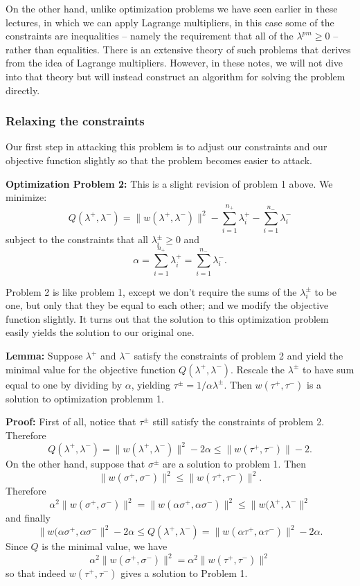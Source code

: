 \documentclass[
]{article}
\begin{document}
On the other hand, unlike optimization problems we have seen earlier in
these lectures, in which we can apply Lagrange multipliers, in this case
some of the constraints are inequalities -- namely the requirement that
all of the \(\lambda^{pm}\ge 0\) -- rather than equalities. There is an
extensive theory of such problems that derives from the idea of Lagrange
multipliers. However, in these notes, we will not dive into that theory
but will instead construct an algorithm for solving the problem
directly.

\hypertarget{relaxing-the-constraints}{%
\subsubsection{Relaxing the
constraints}\label{relaxing-the-constraints}}

Our first step in attacking this problem is to adjust our constraints
and our objective function slightly so that the problem becomes easier
to attack.

\textbf{Optimization Problem 2:} This is a slight revision of problem 1
above. We minimize: \[
Q(\lambda^{+},\lambda^{-}) = \|w(\lambda^{+},\lambda^{-})\|^2-\sum_{i=1}^{n_{+}}\lambda^{+}_{i}-\sum_{i=1}^{n_{-}}\lambda^{-}_{i}
\] subject to the constraints that all \(\lambda^{\pm}_{i}\ge 0\) and \[
\alpha = \sum_{i=1}^{n_{+}}\lambda^+_{i} = \sum_{i=1}^{n_{-}}\lambda^{-}_{i}.
\]

Problem 2 is like problem 1, except we don't require the sums of the
\(\lambda^{\pm}_{i}\) to be one, but only that they be equal to each
other; and we modify the objective function slightly. It turns out that
the solution to this optimization problem easily yields the solution to
our original one.

\textbf{Lemma:} Suppose \(\lambda^{+}\) and \(\lambda^{-}\) satisfy the
constraints of problem 2 and yield the minimal value for the objective
function \(Q(\lambda^{+},\lambda^{-})\). Rescale the \(\lambda^{\pm}\)
to have sum equal to one by dividing by \(\alpha\), yielding
\(\tau^{\pm}=1/\alpha\lambda^{\pm}\). Then \(w(\tau^{+},\tau^{-})\) is a
solution to optimization problemm 1.

\textbf{Proof:} First of all, notice that \(\tau^{\pm}\) still satisfy
the constraints of problem 2. Therefore \[
Q(\lambda^{+},\lambda^{-}) = \|w(\lambda^{+},\lambda^{-})\|^2-2\alpha\le \|w(\tau^{+},\tau^{-})\|-2.
\] On the other hand, suppose that \(\sigma^{\pm}\) are a solution to
problem 1. Then \[
\|w(\sigma^{+},\sigma^{-})\|^2\le \|w(\tau^{+},\tau^{-})\|^2.
\] Therefore \[
\alpha^2 \|w(\sigma^{+},\sigma^{-})\|^2 = \|w(\alpha\sigma^{+},\alpha\sigma^{-})\|^2\le \|w(\lambda^{+},\lambda^{-}\|^2
\] and finally \[
\|w(\alpha\sigma^{+},\alpha\sigma^{-}\|^2-2\alpha\le Q(\lambda^{+},\lambda^{-})=\|w(\alpha\tau^{+},\alpha\tau^{-})\|^2-2\alpha.
\] Since \(Q\) is the minimal value, we have \[
\alpha^{2}\|w(\sigma^{+},\sigma^{-})\|^2 = \alpha^{2}\|w(\tau^{+},\tau^{-})\|^2
\] so that indeed \(w(\tau^{+},\tau^{-})\) gives a solution to Problem
1.
\end{document}
